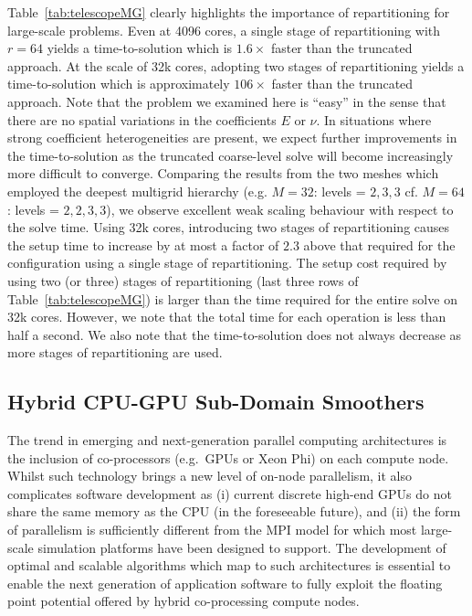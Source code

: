 \documentclass[]{siamart0216}
\begin{document}
Table~\ref{tab:telescopeMG} clearly highlights the importance of repartitioning for large-scale problems.
Even at 4096 cores, a single stage of repartitioning with $r=64$ yields a time-to-solution which is $1.6\times$ faster 
than the truncated  approach. At the scale of 32k cores, adopting two stages of repartitioning yields a time-to-solution 
which is approximately $106\times$ faster than the truncated approach. 
Note that the problem we examined here is ``easy'' in the sense that there are no spatial variations in the coefficients $E$ or $\nu$.
In situations where strong coefficient heterogeneities are present, we expect further improvements in the time-to-solution as the 
truncated coarse-level solve will become increasingly more difficult to converge.
Comparing the results from the two meshes which employed the deepest multigrid hierarchy (e.g. $M=32$: levels = $2,3,3$ cf. $M=64$: levels = $2,2,3,3$), we observe excellent weak scaling behaviour 
with respect to the solve time. 
Using 32k cores, introducing two stages of repartitioning causes the setup time to increase by at most a 
factor of $2.3$ above that required for the configuration using a single stage of repartitioning. 
The setup cost required by using two (or three) stages of repartitioning (last three rows of Table~\ref{tab:telescopeMG}) is larger than the time 
required for the entire solve on 32k cores. However, we note that the total time for each operation is less than half a second.
We also note that the time-to-solution does not always decrease as more stages of repartitioning are used.

\subsection{Hybrid CPU-GPU Sub-Domain Smoothers}
The trend in emerging and next-generation parallel computing architectures is the 
inclusion of co-processors (e.g.~GPUs or Xeon Phi) on each compute node. 
Whilst such technology brings a new level of on-node parallelism, it also complicates 
software development as (i) current discrete high-end GPUs do not share the same 
memory as the CPU (in the foreseeable future), 
and (ii) the form of parallelism is sufficiently different from the MPI model 
for which most large-scale simulation platforms have been designed to support. 
The development of optimal and scalable algorithms which map to such architectures is 
essential to enable the next generation of application software to fully exploit the floating point potential 
offered by hybrid co-processing compute nodes.
\end{document}
